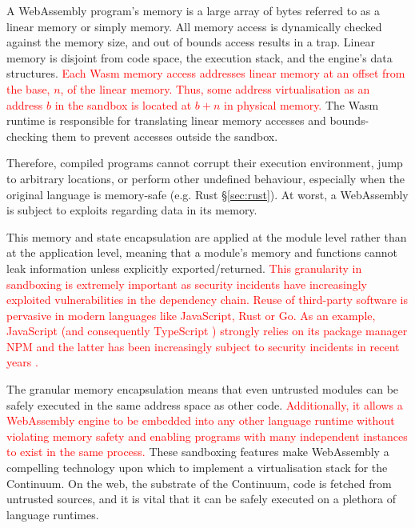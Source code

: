 A WebAssembly program's memory is a large array of bytes referred to as a linear memory or simply memory. All memory access is dynamically checked against the memory size, and out of bounds access results in a trap. Linear memory is disjoint from code space, the execution stack, and the engine's data structures. \textcolor{red}{Each Wasm memory access addresses linear memory at an offset from the base, $n$, of the linear memory. Thus, some address virtualisation as an address $b$ in the sandbox is located at $b + n$ in physical memory.} The Wasm runtime is responsible for translating linear memory accesses and bounds-checking them to prevent accesses outside the sandbox.

Therefore, compiled programs cannot corrupt their execution environment, jump to arbitrary locations, or perform other undefined behaviour, especially when the original language is memory-safe (e.g. Rust §\ref{sec:rust}). At worst, a WebAssembly is subject to exploits regarding data in its memory.

This memory and state encapsulation are applied at the module level rather than at the application level, meaning that a module's memory and functions cannot leak information unless explicitly exported/returned. \textcolor{red}{This granularity in sandboxing is extremely important as security incidents have increasingly exploited vulnerabilities in the dependency chain. Reuse of third-party software is pervasive in modern languages like JavaScript, Rust or Go. As an example, JavaScript (and consequently TypeScript \cite{typescript}) strongly relies on its package manager NPM and the latter has been increasingly subject to security incidents in recent years \cite{npm-security}.}

The granular memory encapsulation means that even untrusted modules can be safely executed in the same address space as other code. \textcolor{red}{Additionally, it allows a WebAssembly engine to be embedded into any other language runtime without violating memory safety and enabling programs with many independent instances to exist in the same process.} These sandboxing features make WebAssembly a compelling technology upon which to implement a virtualisation stack for the Continuum. On the web, the substrate of the Continuum, code is fetched from untrusted sources, and it is vital that it can be safely executed on a plethora of language runtimes.


